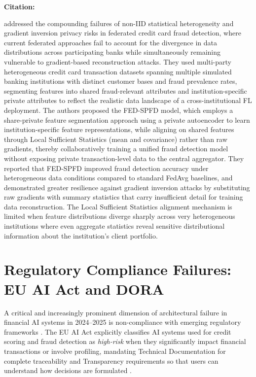 \documentclass[12pt, a4paper]{article}
\newenvironment{surveyentry}[1]{%
  \vspace{6pt}
  \noindent\textbf{\color{navyblue}#1}\par
  \vspace{2pt}
  \noindent\hspace{1em}%
  \begin{minipage}[t]{0.97\linewidth}
}{%
  \end{minipage}
  \vspace{10pt}
}
\begin{document}
\begin{surveyentry}{Citation: \cite{fedspfd2025mdpi}}
\cite{fedspfd2025mdpi} addressed the compounding failures of non-IID statistical heterogeneity and gradient inversion privacy risks in federated credit card fraud detection, where current federated approaches fail to account for the divergence in data distributions across participating banks while simultaneously remaining vulnerable to gradient-based reconstruction attacks. They used multi-party heterogeneous credit card transaction datasets spanning multiple simulated banking institutions with distinct customer bases and fraud prevalence rates, segmenting features into shared fraud-relevant attributes and institution-specific private attributes to reflect the realistic data landscape of a cross-institutional FL deployment. The authors proposed the FED-SPFD model, which employs a share-private feature segmentation approach using a private autoencoder to learn institution-specific feature representations, while aligning on shared features through Local Sufficient Statistics (mean and covariance) rather than raw gradients, thereby collaboratively training a unified fraud detection model without exposing private transaction-level data to the central aggregator. They reported that FED-SPFD improved fraud detection accuracy under heterogeneous data conditions compared to standard FedAvg baselines, and demonstrated greater resilience against gradient inversion attacks by substituting raw gradients with summary statistics that carry insufficient detail for training data reconstruction. The Local Sufficient Statistics alignment mechanism is limited when feature distributions diverge sharply across very heterogeneous institutions where even aggregate statistics reveal sensitive distributional information about the institution's client portfolio.
\end{surveyentry}

\section{Regulatory Compliance Failures: EU AI Act and DORA}

A critical and increasingly prominent dimension of architectural failure in financial AI systems in 2024--2025 is non-compliance with emerging regulatory frameworks \cite{euaiact2024,dora2025}. The EU AI Act explicitly classifies AI systems used for credit scoring and fraud detection as \textit{high-risk} when they significantly impact financial transactions or involve profiling, mandating Technical Documentation for complete traceability and Transparency requirements so that users can understand how decisions are formulated \cite{euaiact2024}.
\end{document}
